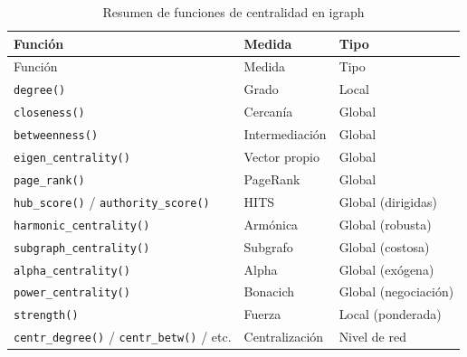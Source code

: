 \documentclass[
  letterpaper,
  DIV=11,
  numbers=noendperiod]{scrreprt}
\begin{document}
\begin{longtable}[]{@{}
  >{\raggedright\arraybackslash}p{}
  >{\raggedright\arraybackslash}p{}
  >{\raggedright\arraybackslash}p{}@{}}
\caption{Resumen de funciones de centralidad en igraph}\tabularnewline
\toprule\noalign{}
\begin{minipage}[b]{\linewidth}\raggedright
Función
\end{minipage} & \begin{minipage}[b]{\linewidth}\raggedright
Medida
\end{minipage} & \begin{minipage}[b]{\linewidth}\raggedright
Tipo
\end{minipage} \\
\midrule\noalign{}
\endfirsthead
\toprule\noalign{}
\begin{minipage}[b]{\linewidth}\raggedright
Función
\end{minipage} & \begin{minipage}[b]{\linewidth}\raggedright
Medida
\end{minipage} & \begin{minipage}[b]{\linewidth}\raggedright
Tipo
\end{minipage} \\
\midrule\noalign{}
\endhead
\bottomrule\noalign{}
\endlastfoot
\texttt{degree()} & Grado & Local \\
\texttt{closeness()} & Cercanía & Global \\
\texttt{betweenness()} & Intermediación & Global \\
\texttt{eigen\_centrality()} & Vector propio & Global \\
\texttt{page\_rank()} & PageRank & Global \\
\texttt{hub\_score()} / \texttt{authority\_score()} & HITS & Global
(dirigidas) \\
\texttt{harmonic\_centrality()} & Armónica & Global (robusta) \\
\texttt{subgraph\_centrality()} & Subgrafo & Global (costosa) \\
\texttt{alpha\_centrality()} & Alpha & Global (exógena) \\
\texttt{power\_centrality()} & Bonacich & Global (negociación) \\
\texttt{strength()} & Fuerza & Local (ponderada) \\
\texttt{centr\_degree()} / \texttt{centr\_betw()} / etc. &
Centralización & Nivel de red \\
\end{longtable}
\end{document}
